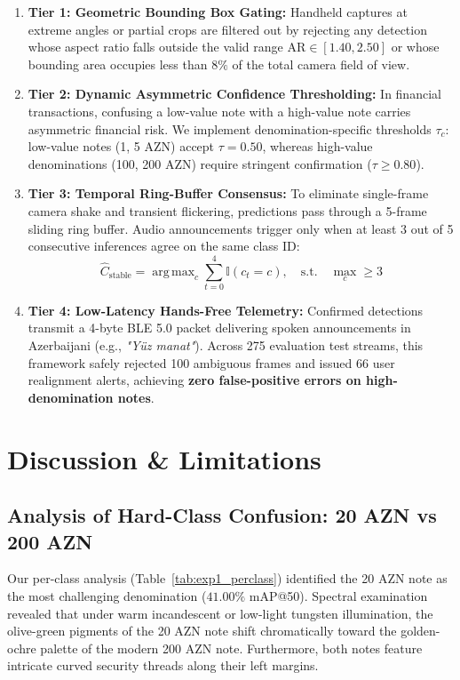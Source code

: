 \documentclass[conference]{IEEEtran}
\DeclareMathOperator*{\argmax}{arg\,max}
\begin{document}
\begin{enumerate}
    \item \textbf{Tier 1: Geometric Bounding Box Gating:} Handheld captures at extreme angles or partial crops are filtered out by rejecting any detection whose aspect ratio falls outside the valid range $\text{AR} \in [1.40, 2.50]$ or whose bounding area occupies less than $8\%$ of the total camera field of view.
    \item \textbf{Tier 2: Dynamic Asymmetric Confidence Thresholding:} In financial transactions, confusing a low-value note with a high-value note carries asymmetric financial risk. We implement denomination-specific thresholds $\tau_c$: low-value notes (1, 5 AZN) accept $\tau = 0.50$, whereas high-value denominations (100, 200 AZN) require stringent confirmation ($\tau \ge 0.80$).
    \item \textbf{Tier 3: Temporal Ring-Buffer Consensus:} To eliminate single-frame camera shake and transient flickering, predictions pass through a 5-frame sliding ring buffer. Audio announcements trigger only when at least 3 out of 5 consecutive inferences agree on the same class ID:
    \begin{equation}
        \hat{C}_{\text{stable}} = \argmax_{c} \sum_{t=0}^4 \mathbb{I}(c_t = c), \quad \text{s.t.} \quad \max_c \ge 3
    \end{equation}
    \item \textbf{Tier 4: Low-Latency Hands-Free Telemetry:} Confirmed detections transmit a 4-byte BLE 5.0 packet delivering spoken announcements in Azerbaijani (e.g., \textit{"Yüz manat"}). Across 275 evaluation test streams, this framework safely rejected 100 ambiguous frames and issued 66 user realignment alerts, achieving \textbf{zero false-positive errors on high-denomination notes}.
\end{enumerate}

\section{Discussion \& Limitations}
\label{sec:discussion}

\subsection{Analysis of Hard-Class Confusion: 20 AZN vs 200 AZN}
Our per-class analysis (Table~\ref{tab:exp1_perclass}) identified the 20 AZN note as the most challenging denomination ($41.00\%$ mAP@50). Spectral examination revealed that under warm incandescent or low-light tungsten illumination, the olive-green pigments of the 20 AZN note shift chromatically toward the golden-ochre palette of the modern 200 AZN note. Furthermore, both notes feature intricate curved security threads along their left margins. 
\end{document}
